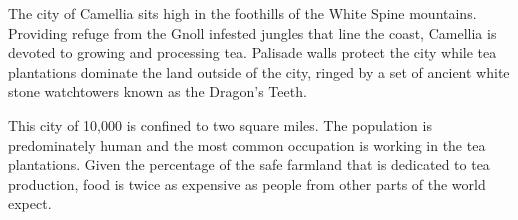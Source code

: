 The city of Camellia sits high in the foothills of the White Spine mountains.
Providing refuge from the Gnoll infested jungles that line the coast, Camellia is devoted to growing and processing tea.
Palisade walls protect the city while tea plantations dominate the land outside of the city, ringed by a set of ancient white stone watchtowers known as the Dragon's Teeth.

This city of 10,000 is confined to two square miles.
The population is predominately human and the most common occupation is working in the tea plantations.
Given the percentage of the safe farmland that is dedicated to tea production, food is twice as expensive as people from other parts of the world expect.
